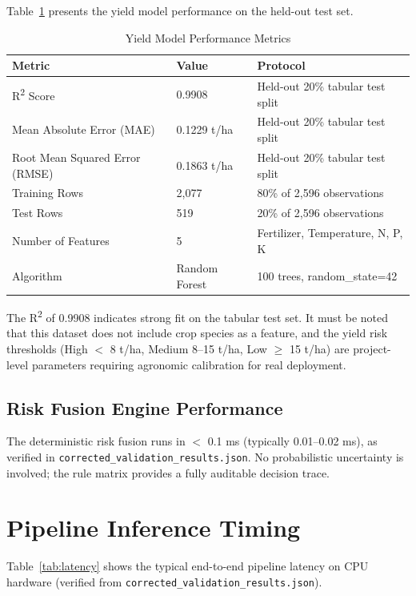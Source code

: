 Table~\ref{tab:yield_perf} presents the yield model performance on the held-out test set.

\begin{table}[H]
\centering
\caption{Yield Model Performance Metrics}
\label{tab:yield_perf}
\begin{tabular}{|p{4.8cm}|p{2.8cm}|p{4.8cm}|}
\hline
\textbf{Metric} & \textbf{Value} & \textbf{Protocol} \\
\hline
R\textsuperscript{2} Score & 0.9908 & Held-out 20\% tabular test split \\
Mean Absolute Error (MAE) & 0.1229 t/ha & Held-out 20\% tabular test split \\
Root Mean Squared Error (RMSE) & 0.1863 t/ha & Held-out 20\% tabular test split \\
Training Rows & 2,077 & 80\% of 2,596 observations \\
Test Rows & 519 & 20\% of 2,596 observations \\
Number of Features & 5 & Fertilizer, Temperature, N, P, K \\
Algorithm & Random Forest & 100 trees, random\_state=42 \\
\hline
\end{tabular}
\end{table}

The R\textsuperscript{2} of 0.9908 indicates strong fit on the tabular test set. It must be noted that this dataset does not include crop species as a feature, and the yield risk thresholds (High $<$ 8 t/ha, Medium 8--15 t/ha, Low $\geq$ 15 t/ha) are project-level parameters requiring agronomic calibration for real deployment.

\subsection{Risk Fusion Engine Performance}

The deterministic risk fusion runs in $<$ 0.1 ms (typically 0.01--0.02 ms), as verified in \texttt{corrected\_validation\_results.json}. No probabilistic uncertainty is involved; the rule matrix provides a fully auditable decision trace.

\section{Pipeline Inference Timing}

Table~\ref{tab:latency} shows the typical end-to-end pipeline latency on CPU hardware (verified from \texttt{corrected\_validation\_results.json}).

